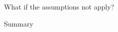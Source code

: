\documentclass[main]{subfiles}
\begin{document}
\begin{frame}[c]{What if the assumptions not apply?}


\end{frame}
\begin{frame}[c]{Summary}


\end{frame}
\end{document}
